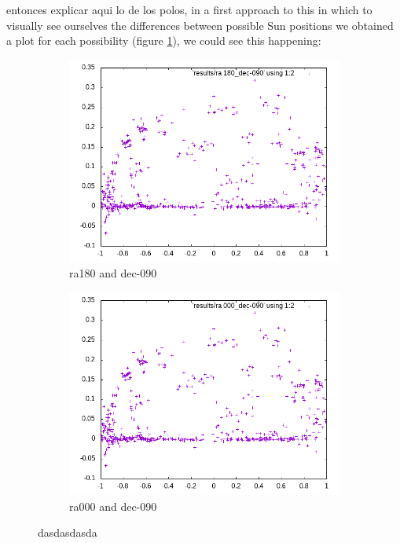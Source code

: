 entonces explicar aqui lo de los polos, in a first approach to this in which to visually see ourselves the differences between possible Sun positions we obtained a plot for each possibility (figure \ref{fig:poles}), we could see this happening:

\begin{figure}[!htb]
	\begin{subfigure}[b]{0.5\textwidth}
		\includegraphics[width=\linewidth]{images/ch4/ra180_dec-090.png}
		\caption{ra180 and dec-090}
	\end{subfigure}
	\hfill
	\begin{subfigure}[b]{0.5\textwidth}
		\includegraphics[width=\linewidth]{images/ch4/ra000_dec-090.png}
		\caption{ra000 and dec-090}
	\end{subfigure}
	\caption{dasdasdasda}
	\label{fig:poles}
\end{figure}


